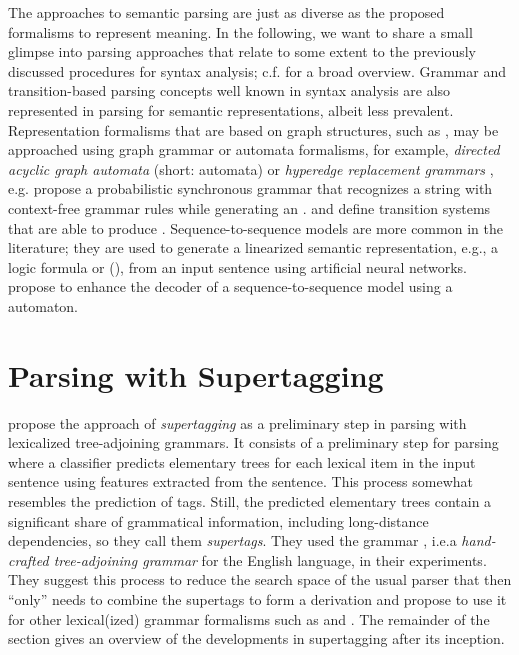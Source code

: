 \documentclass[../document.tex]{subfiles}
\begin{document}
    The approaches to semantic parsing are just as diverse as the proposed formalisms to represent meaning.
    In the following, we  want to share a small glimpse into parsing approaches that relate to some extent to the previously discussed procedures for syntax analysis; c.f.\@ \citet{kamath2018survey} for a broad overview.
    Grammar and transition-based parsing concepts well known in syntax analysis are also represented in parsing for semantic representations, albeit less prevalent.
    Representation formalisms that are based on graph structures, such as , may be approached using graph grammar or automata formalisms, for example, \emph{directed acyclic graph automata} (short:  automata) \citep{fancellu-etal-2019-semantic} or \emph{hyperedge replacement grammars} \citep{drewes1997hyperedge}, e.g.\@ \citet{peng2015synchronous} propose a probabilistic synchronous grammar that recognizes a string with context-free grammar rules while generating an .
     and \citet{vilares-gomez-rodriguez-2018-transition} define transition systems that are able to produce .
    Sequence-to-sequence models are more common in the literature; they are used to generate a linearized semantic representation, e.g.\@, a logic formula \citep{dong-lapata-2016-language} or  (\citep{zhang-etal-2019-amr}), from an input sentence using artificial neural networks.
     propose to enhance the decoder of a sequence-to-sequence model using a  automaton.

    \section{Parsing with Supertagging}\label{sec:literature:supertagging}
     propose the approach of \emph{supertagging} as a preliminary step in parsing with lexicalized tree-adjoining grammars.
    It consists of a preliminary step for parsing where a classifier predicts elementary trees for each lexical item in the input sentence using features extracted from the sentence.
    This process somewhat resembles the prediction of  tags. Still, the predicted elementary trees contain a significant share of grammatical information, including long-distance dependencies, so they call them \emph{supertags}.
    They used the  grammar \citep{xtag01}, i.e.\@ a \emph{hand-crafted tree-adjoining grammar} for the English language, in their experiments.
    They suggest this process to reduce the search space of the usual parser that then ``only'' needs to combine the supertags to form a derivation and propose to use it for other lexical(ized) grammar formalisms such as  and .
    The remainder of the section gives an overview of the developments in supertagging after its inception.
\end{document}
